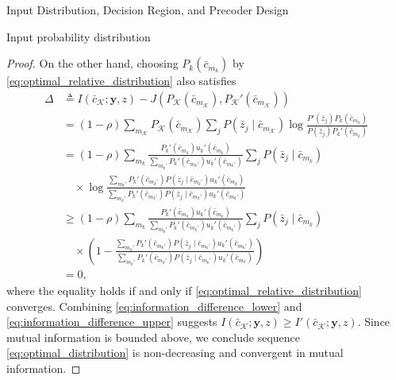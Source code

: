 \documentclass[journal]{IEEEtran}
\begin{document}
\begin{section}{Input Distribution, Decision Region, and Precoder Design}
\begin{subsection}{Input probability distribution}
\begin{proof}
				On the other hand, choosing $P_k(\bar{c}_{m_k})$ by \eqref{eq:optimal_relative_distribution} also satisfies
				\begin{subequations}
					\label{eq:information_difference_upper}
					\begin{align}
						\Delta
						& \triangleq I(\bar{c}_{\mathcal{K}};\boldsymbol{y},z) - J \left( P_{\mathcal{K}}(\bar{c}_{m_{\mathcal{K}}}),P_{\mathcal{K}}'(\bar{c}_{m_{\mathcal{K}}}) \right)\\
						& = (1 - \rho) \sum_{m_{\mathcal{K}}} P_{\mathcal{K}}(\bar{c}_{m_{\mathcal{K}}}) \sum_j P(\bar{z}_j \mid \bar{c}_{m_{\mathcal{K}}}) \log \frac{P'(\bar{z}_j) P_k(\bar{c}_{m_k})}{P(\bar{z}_j) P_k'(\bar{c}_{m_k})}\\
						& = (1 - \rho) \sum_{m_k} \frac{P_k'(\bar{c}_{m_k}) u_k'(\bar{c}_{m_k})}{\sum_{m_k'} P_k'(\bar{c}_{m_k'}) u_k'(\bar{c}_{m_k'})} \sum_j P(\bar{z}_j \mid \bar{c}_{m_k})\nonumber\\
						& \quad \times \log \frac{\sum_{m_k'} P_k'(\bar{c}_{m_k'}) P(\bar{z}_j \mid \bar{c}_{m_k'}) u_k'(\bar{c}_{m_k})}{\sum_{m_k'} P_k'(\bar{c}_{m_k'}) P(\bar{z}_j \mid \bar{c}_{m_k'}) u_k'(\bar{c}_{m_k'})}\\
						& \ge (1 - \rho) \sum_{m_k} \frac{P_k'(\bar{c}_{m_k}) u_k'(\bar{c}_{m_k})}{\sum_{m_k'} P_k'(\bar{c}_{m_k'}) u_k'(\bar{c}_{m_k'})} \sum_j P(\bar{z}_j \mid \bar{c}_{m_k})\nonumber\\
						& \quad \times \left( 1 - \frac{\sum_{m_k'} P_k'(\bar{c}_{m_k'}) P(\bar{z}_j \mid \bar{c}_{m_k'}) u_k'(\bar{c}_{m_k'})}{\sum_{m_k'} P_k'(\bar{c}_{m_k'}) P(\bar{z}_j \mid \bar{c}_{m_k'}) u_k'(\bar{c}_{m_k})} \right)\\
						& = 0,
					\end{align}
				\end{subequations}
				where the equality holds if and only if \eqref{eq:optimal_relative_distribution} converges. Combining \eqref{eq:information_difference_lower} and \eqref{eq:information_difference_upper} suggests $I(\bar{c}_{\mathcal{K}};\boldsymbol{y},z) \ge I'(\bar{c}_{\mathcal{K}};\boldsymbol{y},z)$. Since mutual information is bounded above, we conclude sequence \eqref{eq:optimal_distribution} is non-decreasing and convergent in mutual information.


\end{proof}
\end{subsection}
\end{section}
\end{document}
